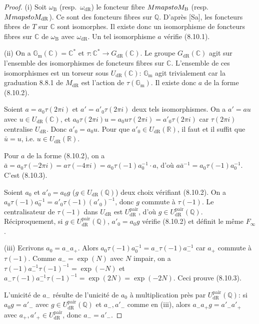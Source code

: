 \documentclass[12pt,a4paper]{article}
\theoremstyle{plain}
\theoremstyle{definition}
\theoremstyle{remark}
\newcommand{\DR}{\mathrm{dR}}
\newcommand{\B}{\mathrm{B}}
\newcommand{\Q}{\mathbb{Q}}
\newcommand{\C}{\mathbb{C}}
\newcommand{\R}{\mathbb{R}}
\newcommand{\Gm}{\mathbb{G}_\mathrm{m}}
\begin{document}
\begin{proof}
(i) Soit $\omega_\B$ (resp.~$\omega_\DR$) le foncteur fibre $M \\mapsto M_\B$ (resp.~$M \\mapsto M_\DR$). Ce sont des foncteurs fibres sur $\Q$. D'apr\`es [Sa], les foncteurs fibres de $T$ sur $\C$ sont isomorphes. Il existe donc un isomorphisme de foncteurs fibres sur $\C$ de $\omega_\B$ avec $\omega_\DR$. Un tel isomorphisme $a$ v\'erifie (8.10.1).

(ii) On a $\Gm(\C) = \C^*$ et $\tau: \C^* \to G_\DR(\C)$. Le groupe $G_\DR(\C)$ agit sur l'ensemble des isomorphismes de foncteurs fibres sur $\C$. L'ensemble de ces isomorphismes est un torseur sous $U_\DR(\C)$: $\Gm$ agit trivialement car la graduation 8.8.1 de $M_\DR$ est l'action de $\tau(\Gm)$. Il existe donc $a$ de la forme (8.10.2).

Soient $a = a_0 \tau(2\pi i)$ et $a' = a'_0 \tau(2\pi i)$ deux tels isomorphismes. On a $a' = a u$ avec $u \in U_\DR(\C)$, et $a_0 \tau(2\pi i) u = a_0 u \tau(2\pi i) = a'_0 \tau(2\pi i)$ car $\tau(2\pi i)$ centralise $U_\DR$. Donc $a'_0 = a_0 u$. Pour que $a'_0 \in U_\DR(\R)$, il faut et il suffit que $\bar{u} = u$, i.e. $u \in U_\DR(\R)$.

Pour $a$ de la forme (8.10.2), on a $\bar{a} = a_0 \tau(-2\pi i) = a \tau(-4\pi i) = a_0 \tau(-1) a_0^{-1} \cdot a$, d'o\`u $a \bar{a}^{-1} = a_0 \tau(-1) a_0^{-1}$. C'est (8.10.3).

Soient $a_0$ et $a'_0 = a_0 g$ ($g \in U_\DR(\Q)$) deux choix v\'erifiant (8.10.2). On a $a_0 \tau(-1) a_0^{-1} = a'_0 \tau(-1) (a'_0)^{-1}$, donc $g$ commute \`a $\tau(-1)$. Le centralisateur de $\tau(-1)$ dans $U_\DR$ est $U_\DR^{\mathrm{pair}}$, d'o\`u $g \in U_\DR^{\mathrm{pair}}(\Q)$. R\'eciproquement, si $g \in U_\DR^{\mathrm{pair}}(\Q)$, $a'_0 = a_0 g$ v\'erifie (8.10.2) et d\'efinit le m\^eme $F_\infty$.

(iii) Ecrivons $a_0 = a_- a_+$. Alors $a_0 \tau(-1) a_0^{-1} = a_- \tau(-1) a_-^{-1}$ car $a_+$ commute \`a $\tau(-1)$. Comme $a_- = \exp(N)$ avec $N$ impair, on a $\tau(-1) a_-^{-1} \tau(-1)^{-1} = \exp(-N)$ et $a_- \tau(-1) a_-^{-1} \tau(-1)^{-1} = \exp(2N) = \exp(-2N)$. Ceci prouve (8.10.3).

L'unicit\'e de $a_-$ r\'esulte de l'unicit\'e de $a_0$ \`a multiplication pr\`es par $U_\DR^{\mathrm{pair}}(\Q)$: si $a_0 g = a'_-$ avec $g \in U_\DR^{\mathrm{pair}}(\Q)$ et $a_-, a'_-$ comme en (iii), alors $a_- a_+ g = a'_- a'_+$ avec $a_+, a'_+ \in U_\DR^{\mathrm{pair}}$, donc $a_- = a'_-$.
\end{proof}
\end{document}
